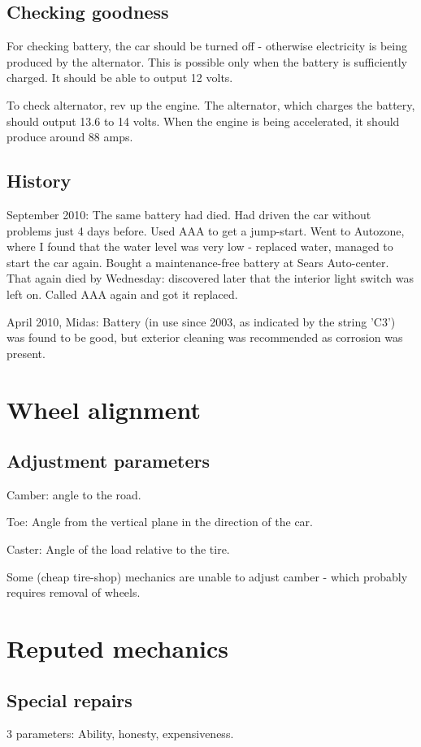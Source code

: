 \documentclass[oneside, article]{memoir}
\begin{document}
\subsection{Checking goodness}
For checking battery, the car should be turned off - otherwise electricity is being produced by the alternator. This is possible only when the battery is sufficiently charged. It should be able to output 12 volts.

To check alternator, rev up the engine. The alternator, which charges the battery, should output 13.6 to 14 volts. When the engine is being accelerated, it should produce around 88 amps.

\subsection{History}
September 2010: The same battery had died. Had driven the car without problems just 4 days before. Used AAA to get a jump-start. Went to Autozone, where I found that the water level was very low - replaced water, managed to start the car again. Bought a maintenance-free battery at Sears Auto-center. That again died by Wednesday: discovered later that the interior light switch was left on. Called AAA again and got it replaced.

April 2010, Midas: Battery (in use since 2003, as indicated by the string 'C3') was found to be good, but exterior cleaning  was recommended as corrosion was present.

\section{Wheel alignment}
\subsection{Adjustment parameters}
Camber: angle to the road.

Toe: Angle from the vertical plane in the direction of the car.

Caster: Angle of the load relative to the tire.

Some (cheap tire-shop) mechanics are unable to adjust camber - which probably requires removal of wheels.

\section{Reputed mechanics}
\subsection{Special repairs}
3 parameters: Ability, honesty, expensiveness.
\end{document}
